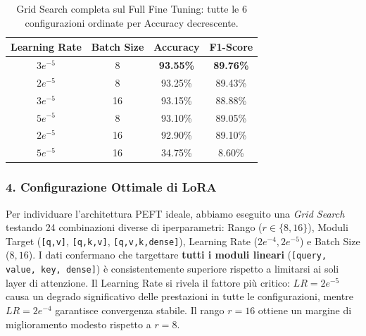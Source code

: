 \documentclass[a4paper,12pt]{article}
\begin{document}
\begin{table}[H]
    \centering
    \begin{tabular}{|c|c|c|c|}
        \hline
        \textbf{Learning Rate} & \textbf{Batch Size} & \textbf{Accuracy} & \textbf{F1-Score} \\
        \hline
        $3e^{-5}$              & 8                   & \textbf{93.55\%}  & \textbf{89.76\%}  \\
        $2e^{-5}$              & 8                   & 93.25\%           & 89.43\%           \\
        $3e^{-5}$              & 16                  & 93.15\%           & 88.88\%           \\
        $5e^{-5}$              & 8                   & 93.10\%           & 89.05\%           \\
        $2e^{-5}$              & 16                  & 92.90\%           & 89.10\%           \\
        $5e^{-5}$              & 16                  & 34.75\%           & 8.60\%            \\
        \hline
    \end{tabular}
    \caption{Grid Search completa sul Full Fine Tuning: tutte le 6 configurazioni ordinate per Accuracy decrescente.}
\end{table}
\subsubsection{4. Configurazione Ottimale di LoRA}
Per individuare l'architettura PEFT ideale, abbiamo eseguito una \textit{Grid Search} testando 24 combinazioni diverse di iperparametri: Rango ($r \in \{8, 16\}$), Moduli Target (\texttt{[q,v]}, \texttt{[q,k,v]}, \texttt{[q,v,k,dense]}), Learning Rate ($2e^{-4}, 2e^{-5}$) e Batch Size ($8, 16$).
I dati confermano che targettare \textbf{tutti i moduli lineari} (\texttt{[query, value, key, dense]}) è consistentemente superiore rispetto a limitarsi ai soli layer di attenzione. Il Learning Rate si rivela il fattore più critico: $LR = 2e^{-5}$ causa un degrado significativo delle prestazioni in tutte le configurazioni, mentre $LR = 2e^{-4}$ garantisce convergenza stabile. Il rango $r=16$ ottiene un margine di miglioramento modesto rispetto a $r=8$.
\end{document}
